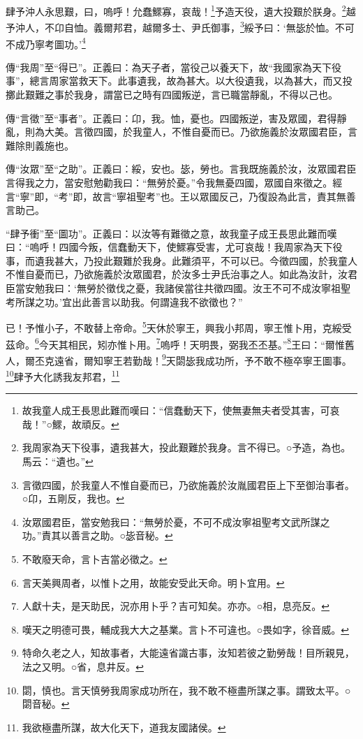 肆予沖人永思艱，曰，嗚呼！允蠢鰥寡，哀哉！\footnote{故我童人成王長思此難而嘆曰：“信蠢動天下，使無妻無夫者受其害，可哀哉！”○鰥，故頑反。}予造天役，遺大投艱於朕身。\footnote{我周家為天下役事，遺我甚大，投此艱難於我身。言不得已。○予造，為也。馬云：“遺也。”}越予沖人，不卬自恤。義爾邦君，越爾多士、尹氏御事，\footnote{言徵四國，於我童人不惟自憂而已，乃欲施義於汝胤國君臣上下至御治事者。○卬，五剛反，我也。}綏予曰：‘無毖於恤。不可不成乃寧考圖功。’\footnote{汝眾國君臣，當安勉我曰：“無勞於憂，不可不成汝寧祖聖考文武所謀之功。”責其以善言之助。○毖音秘。}


{\noindent\zhuan{}\fzbyks 傳“我周”至“得已”。正義曰：為天子者，當役己以養天下，故“我國家為天下役事”，總言周家當救天下。此事遺我，故為甚大。以大役遺我，以為甚大，而又投擲此艱難之事於我身，謂當已之時有四國叛逆，言已職當靜亂，不得以己也。 \par}

{\noindent\zhuan{}\fzbyks 傳“言徵”至“事者”。正義曰：卬，我。恤，憂也。四國叛逆，害及眾國，君得靜亂，則為大美。言徵四國，於我童人，不惟自憂而已。乃欲施義於汝眾國君臣，言難除則義施也。 \par}

{\noindent\zhuan{}\fzbyks 傳“汝眾”至“之助”。正義曰：綏，安也。毖，勞也。言我既施義於汝，汝眾國君臣言得我之力，當安慰勉勸我曰：“無勞於憂。”令我無憂四國，眾國自來徵之。經言“寧”即，“考”即，故言“寧祖聖考”也。王以眾國反己，乃復設為此言，責其無善言助己。 \par}

{\noindent\shu{}\fzkt “肆予衝”至“圖功”。正義曰：以汝等有難徵之意，故我童子成王長思此難而嘆曰：“嗚呼！四國今叛，信蠢動天下，使鰥寡受害，尤可哀哉！我周家為天下役事，而遺我甚大，乃投此艱難於我身。此難須平，不可以已。今徵四國，於我童人不惟自憂而已，乃欲施義於汝眾國君，於汝多士尹氏治事之人。如此為汝計，汝君臣當安勉我曰：‘無勞於徵伐之憂，我諸侯當往共徵四國。汝王不可不成汝寧祖聖考所謀之功。’宜出此善言以助我。何謂違我不欲徵也？” \par}

已！予惟小子，不敢替上帝命。\footnote{不敢廢天命，言卜吉當必徵之。}天休於寧王，興我小邦周，寧王惟卜用，克綏受茲命。\footnote{言天美興周者，以惟卜之用，故能安受此天命。明卜宜用。}今天其相民，矧亦惟卜用。\footnote{人獻十夫，是天助民，況亦用卜乎？吉可知矣。亦亦。○相，息亮反。}嗚呼！天明畏，弼我丕丕基。”\footnote{嘆天之明德可畏，輔成我大大之基業。言卜不可違也。○畏如字，徐音威。}王曰：“爾惟舊人，爾丕克遠省，爾知寧王若勤哉！\footnote{特命久老之人，知故事者，大能遠省識古事，汝知若彼之勤勞哉！目所親見，法之又明。○省，息井反。}天閟毖我成功所，予不敢不極卒寧王圖事。\footnote{閟，慎也。言天慎勞我周家成功所在，我不敢不極盡所謀之事。謂致太平。○閟音秘。}肆予大化誘我友邦君，\footnote{我欲極盡所謀，故大化天下，道我友國諸侯。}



